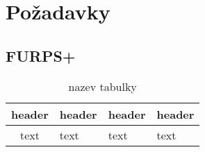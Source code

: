  \chapter{Požadavky}
 
 \section{FURPS+}
 
 
 
 \begin{table}[H]
 	\begin{center}
 		\begin{tabular}{ | c | p{6cm} | l | p{2cm} |}
 			\hline
 			header & header & header & header \\ \hline
 			text & text & text & text \\
 			\hline		
 		\end{tabular}
 	\end{center}
 	\caption{nazev tabulky}
 	\label{tab:errors}
 \end{table}